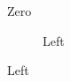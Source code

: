 \documentclass{article}
\begin{document}
\begin{figure}\caption{Zero}\label{f0}\end{figure}
\begin{figure}
\caption{Above}\label{f1}
\begin{subfigure}{0.4\textwidth}\caption{Left}\label{fa}\end{subfigure}
\end{figure}
\end{document}
